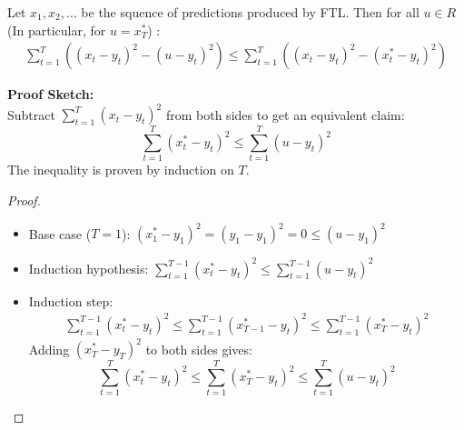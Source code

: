 \documentclass{beamer}
\begin{document}
\begin{frame}
  \begin{lemma}
    Let $x_1, x_2,\ldots$ be the squence of predictions produced by FTL. Then for all $u \in R$ (In particular, for $u=x^*_T$) :
    \begin{eqnarray*}
	\sum_{t=1}^T \left( (x_t-y_t)^2 - (u - y_t)^2\right) \leq  \sum_{t=1}^T \left( (x_t-y_t)^2 - (x^*_t- y_t)^2\right)
    \end{eqnarray*}
  \end{lemma}
  {\bf Proof Sketch:}\\
  Subtract $\sum_{t=1}^T (x_t-y_t)^2$ from both sides to get an equivalent claim:
  \[
    \sum_{t=1}^T (x^*_t- y_t)^2 \leq \sum_{t=1}^T (u - y_t)^2
  \]
The inequality is proven by induction on $T$.
\end{frame}

\begin{frame}
\begin{proof}
\begin{itemize}
\item Base case ($T=1$): $(x^*_1 - y_1)^2 = (y_1 - y_1)^2 = 0 \le (u-y_1)^2$
\item Induction hypothesis: $\sum_{t=1}^{T-1}(x^*_t - y_t)^2 \leq \sum_{t=1}^{T-1} (u - y_t)^2$
\item Induction step:
    \begin{eqnarray*}
    	\sum_{t=1}^{T-1}(x^*_t - y_t)^2 \leq \sum_{t=1}^{T-1}(x^*_{T-1} - y_t)^2 \leq \sum_{t=1}^{T-1}(x^*_{T} - y_t)^2
    \end{eqnarray*}
    Adding $(x^*_T - y_T)^2$ to both sides gives: $$\sum_{t=1}^{T}(x^*_t - y_t)^2 \leq \sum_{t=1}^{T} (x^*_{T} - y_t)^2  \leq \sum_{t=1}^{T} (u - y_t)^2$$
\end{itemize}
\end{proof}
\end{frame}

%
\end{document}
